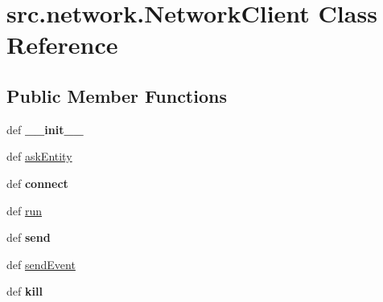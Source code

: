 \hypertarget{classsrc_1_1network_1_1_network_client}{\section{src.\-network.\-Network\-Client \-Class \-Reference}
\label{classsrc_1_1network_1_1_network_client}
}
\subsection*{\-Public \-Member \-Functions}
\begin{DoxyCompactItemize}
\item 
\hypertarget{classsrc_1_1network_1_1_network_client_a58431ba3aadb56f426c6795cdbdcaca7}{def {\bfseries \-\_\-\-\_\-init\-\_\-\-\_\-}}\label{classsrc_1_1network_1_1_network_client_a58431ba3aadb56f426c6795cdbdcaca7}

\item 
def \hyperlink{classsrc_1_1network_1_1_network_client_a92e052430be6f4729c3aacc41718d8ef}{ask\-Entity}
\item 
\hypertarget{classsrc_1_1network_1_1_network_client_a53444af33b8fe168143f296a6dfd1e53}{def {\bfseries connect}}\label{classsrc_1_1network_1_1_network_client_a53444af33b8fe168143f296a6dfd1e53}

\item 
def \hyperlink{classsrc_1_1network_1_1_network_client_ad48886d4647613e7f5d620bf21be4373}{run}
\item 
\hypertarget{classsrc_1_1network_1_1_network_client_a02c88c1d8896faabe0a7b551c382bc9d}{def {\bfseries send}}\label{classsrc_1_1network_1_1_network_client_a02c88c1d8896faabe0a7b551c382bc9d}

\item 
def \hyperlink{classsrc_1_1network_1_1_network_client_ad33e037a897cecb80e805a09bf70d4e8}{send\-Event}
\item 
\hypertarget{classsrc_1_1network_1_1_network_client_af1fe7118a9f57a81fb0d54a6bdb32548}{def {\bfseries kill}}\label{classsrc_1_1network_1_1_network_client_af1fe7118a9f57a81fb0d54a6bdb32548}

\end{DoxyCompactItemize}
